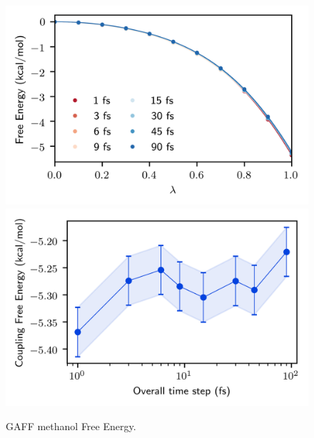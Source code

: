 \documentclass[
aip,
jcp,
reprint,
]{revtex4-1}
\begin{document}
\begin{figure}
	\centering
	\includegraphics{gaff_methanol_coul_free_energy_profiles}
	\includegraphics{gaff_methanol_coul_free_energies}
	\caption{GAFF methanol Free Energy.}
	\label{fig:methanol coulomb free energy}
\end{figure}
\end{document}
